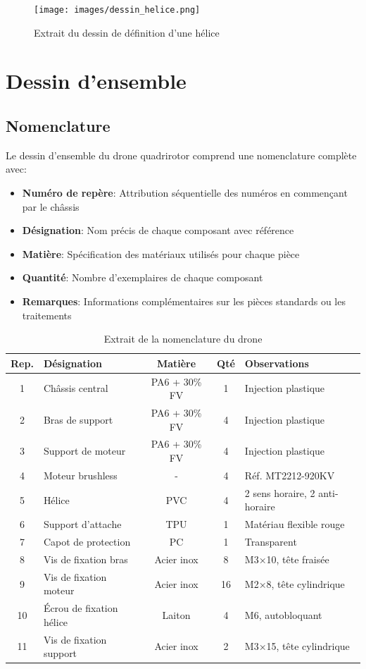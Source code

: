 \documentclass[a4paper,12pt]{report}
\begin{document}
\begin{figure}[H]
    \centering
    \texttt{[image: images/dessin\_helice.png]}
    \caption{Extrait du dessin de définition d'une hélice}
    \label{fig:dessin_helice}
\end{figure}

\chapter{Dessin d'ensemble}
\section{Nomenclature}
Le dessin d'ensemble du drone quadrirotor comprend une nomenclature complète avec:

\begin{itemize}
    \item \textbf{Numéro de repère}: Attribution séquentielle des numéros en commençant par le châssis
    \item \textbf{Désignation}: Nom précis de chaque composant avec référence
    \item \textbf{Matière}: Spécification des matériaux utilisés pour chaque pièce
    \item \textbf{Quantité}: Nombre d'exemplaires de chaque composant
    \item \textbf{Remarques}: Informations complémentaires sur les pièces standards ou les traitements
\end{itemize}

\begin{table}[H]
    \centering
    \caption{Extrait de la nomenclature du drone}
    \begin{tabular}{|c|l|c|c|l|}
        \hline
        \textbf{Rep.} & \textbf{Désignation} & \textbf{Matière} & \textbf{Qté} & \textbf{Observations} \\
        \hline
        1 & Châssis central & PA6 + 30\% FV & 1 & Injection plastique \\
        2 & Bras de support & PA6 + 30\% FV & 4 & Injection plastique \\
        3 & Support de moteur & PA6 + 30\% FV & 4 & Injection plastique \\
        4 & Moteur brushless & - & 4 & Réf. MT2212-920KV \\
        5 & Hélice & PVC & 4 & 2 sens horaire, 2 anti-horaire \\
        6 & Support d'attache & TPU & 1 & Matériau flexible rouge \\
        7 & Capot de protection & PC & 1 & Transparent \\
        8 & Vis de fixation bras & Acier inox & 8 & M3×10, tête fraisée \\
        9 & Vis de fixation moteur & Acier inox & 16 & M2×8, tête cylindrique \\
        10 & Écrou de fixation hélice & Laiton & 4 & M6, autobloquant \\
        11 & Vis de fixation support & Acier inox & 2 & M3×15, tête cylindrique \\
        \hline
    \end{tabular}
    \label{tab:nomenclature}
\end{table}
\end{document}
